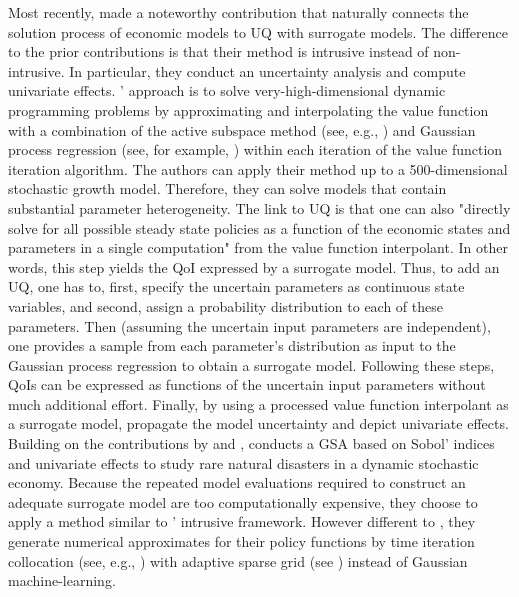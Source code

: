 \documentclass[a4paper,12pt]{article}
\begin{document}
\newline
Most recently, \cite{Scheidegger.2019} made a noteworthy contribution that naturally connects the solution process of economic models to UQ with surrogate models. The difference to the prior contributions is that their method is intrusive instead of non-intrusive. In particular, they conduct an uncertainty analysis and compute univariate effects. \citeauthor{Scheidegger.2019}' approach is to solve very-high-dimensional dynamic programming problems by approximating and interpolating the value function with a combination of the active subspace method (see, e.g., \cite{Constantine.2015}) and Gaussian process regression (see, for example, \cite{Rasmussen.2005}) within each iteration of the value function iteration algorithm. The authors can apply their method up to a 500-dimensional stochastic growth model. Therefore, they can solve models that contain substantial parameter heterogeneity.
The link to UQ is that one can also "directly solve for all possible steady state policies as a function of the economic states and parameters in a single computation" \cite[p.~4]{Scheidegger.2019} from the value function interpolant. In other words, this step yields the QoI expressed by a surrogate model. Thus, to add an UQ, one has to, first, specify the uncertain parameters as continuous state variables, and second, assign a probability distribution to each of these parameters. Then (assuming the uncertain input parameters are independent), one provides a sample from each parameter's distribution as input to the Gaussian process regression to obtain a surrogate model. Following these steps, QoIs can be expressed as functions of the uncertain input parameters without much additional effort. Finally, by using a processed value function interpolant as a surrogate model, \citeauthor{Scheidegger.2019} propagate the model uncertainty and depict univariate effects.\\
\newline
Building on the contributions by \cite{Harenberg.2019} and \cite{Scheidegger.2019}, \cite{Usui.2019} conducts a GSA based on Sobol' indices and univariate effects to study rare natural disasters in a dynamic stochastic economy. Because the repeated model evaluations required to construct an adequate surrogate model are too computationally expensive, they choose to apply a  method similar to \citeauthor{Scheidegger.2019}' intrusive framework. However different to \cite{Scheidegger.2019}, they generate numerical approximates for their policy functions by time iteration collocation (see, e.g., \cite{Judd.1998}) with adaptive sparse grid (see  \cite{Scheidegger.2018}) instead of Gaussian machine-learning.\\
\end{document}

